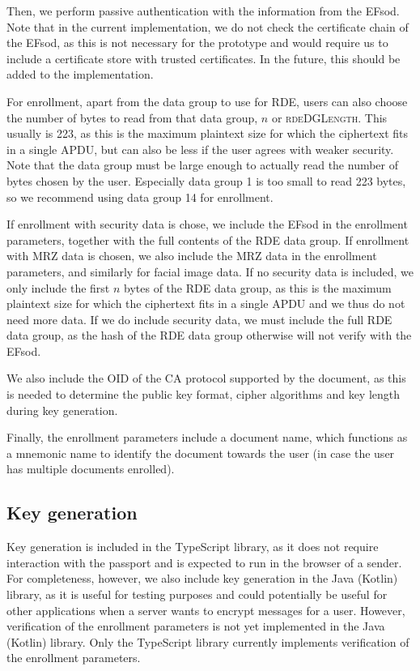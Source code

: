 Then, we perform passive authentication with the information from the EFsod.
Note that in the current implementation, we do not check the certificate chain of the EFsod, as this is not necessary for the prototype and would require us to include a certificate store with trusted certificates.
In the future, this should be added to the implementation.

For enrollment, apart from the data group to use for RDE, users can also choose the number of bytes to read from that data group, $n$ or \textsc{rdeDGLength}.
This usually is 223, as this is the maximum plaintext size for which the ciphertext fits in a single APDU, but can also be less if the user agrees with weaker security.
Note that the data group must be large enough to actually read the number of bytes chosen by the user.
Especially data group 1 is too small to read 223 bytes, so we recommend using data group 14 for enrollment.

If enrollment with security data is chose, we include the EFsod in the enrollment parameters, together with the full contents of the RDE data group.
If enrollment with MRZ data is chosen, we also include the MRZ data in the enrollment parameters, and similarly for facial image data.
If no security data is included, we only include the first $n$ bytes of the RDE data group, as this is the maximum plaintext size for which the ciphertext fits in a single APDU and we thus do not need more data.
If we do include security data, we must include the full RDE data group, as the hash of the RDE data group otherwise will not verify with the EFsod.

We also include the OID of the CA protocol supported by the document, as this is needed to determine the public key format, cipher algorithms and key length during key generation.

Finally, the enrollment parameters include a document name, which functions as a mnemonic name to identify the document towards the user (in case the user has multiple documents enrolled).

\subsection{Key generation}\label{subsec:key-generation}
Key generation is included in the TypeScript library, as it does not require interaction with the passport and is expected to run in the browser of a sender.
For completeness, however, we also include key generation in the Java (Kotlin) library, as it is useful for testing purposes and could potentially be useful for other applications when a server wants to encrypt messages for a user.
However, verification of the enrollment parameters is not yet implemented in the Java (Kotlin) library.
Only the TypeScript library currently implements verification of the enrollment parameters.

